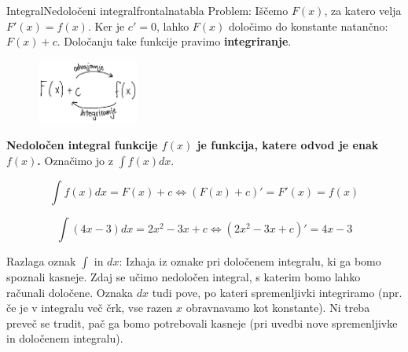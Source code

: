 \begin{priprava}{}{}{Integral}{Nedoločeni integral}{frontalna}{tabla}
Problem: Iščemo $ F(x) $, za katero velja $ F'(x) = f(x) $. Ker je $ c' = 0 $, lahko $ F(x) $ določimo do konstante natančno: $ F(x) + c $. Določanju take funkcije pravimo \textbf{integriranje}.

\newpage


\begin{figure}[h]
    \centering
    \includegraphics[width=0.3\textwidth]{slike/povezava_F(x)_f(x).png}
\end{figure}


\textbf{Nedoločen integral funkcije $ f(x) $ je funkcija, katere odvod je enak $ f(x) $.} Označimo jo z $ \int f(x) dx $.

$$
    \int f(x) dx = F(x) + c \Longleftrightarrow (F(x) + c)' = F'(x) = f(x)
$$


$$
    \int (4x - 3) dx = 2x^2 - 3x + c \Longleftrightarrow (2x^2 - 3x + c)' = 4x - 3
$$

\textcolor{rdeca}{Razlaga oznak $ \int $ in $ dx $:} Izhaja iz oznake pri določenem integralu, ki ga bomo spoznali kasneje. Zdaj se učimo nedoločen integral, s katerim bomo lahko računali določene. Oznaka $ dx $ tudi pove, po kateri spremenljivki integriramo (npr. če je v integralu več črk, vse razen $ x $ obravnavamo kot konstante). Ni treba preveč se trudit, pač ga bomo potrebovali kasneje (pri uvedbi nove spremenljivke in določenem integralu).




\end{priprava}
